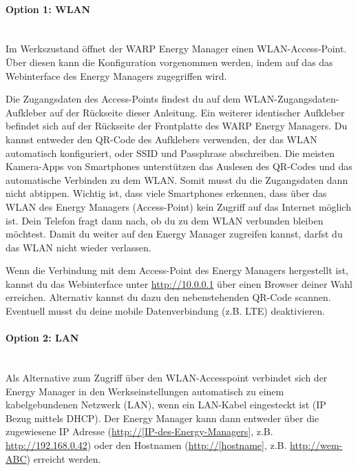 \documentclass[a4paper,10pt]{article}
\begin{document}
\begin{multicols*}{2}
	\paragraph{Option 1: WLAN}\ \\

	Im Werkszustand öffnet der WARP Energy Manager einen WLAN-Access-Point. Über diesen kann
	die Konfiguration vorgenommen werden, indem auf das das Webinterface des
	Energy Managers zugegriffen wird.

	Die Zugangsdaten des Access-Points findest du auf dem WLAN-Zugangsdaten-Aufkleber
	auf der Rückseite dieser Anleitung. Ein weiterer identischer Aufkleber
	befindet sich auf der Rückseite der Frontplatte des WARP Energy Managers.
	Du kannst entweder den QR-Code des Aufklebers verwenden,
	der das WLAN automatisch konfiguriert, oder SSID und Passphrase abschreiben.
	Die meisten Kamera-Apps von Smartphones unterstützen das Auslesen des
	QR-Codes und das automatische Verbinden zu dem WLAN. Somit musst du die
	Zugangsdaten dann nicht abtippen. Wichtig ist, dass viele Smartphones
	erkennen, dass über das WLAN des Energy Managers (Access-Point) kein Zugriff auf das
	Internet möglich ist. Dein Telefon fragt dann nach, ob du zu dem WLAN
	verbunden bleiben möchtest. Damit du weiter auf den Energy Manager zugreifen
	kannst, darfst du das WLAN nicht wieder verlassen.

	\begin{minipage}{0.35\textwidth}
		Wenn die Verbindung mit dem Access-Point des Energy Managers hergestellt ist, kannst du das Webinterface
		unter \url{http://10.0.0.1} über einen Browser deiner Wahl erreichen.
		Alternativ kannst du dazu den nebenstehenden QR-Code scannen.
		Eventuell musst du deine mobile Datenverbindung (z.B. LTE) deaktivieren.
	\end{minipage}\hfill
	\begin{minipage}{0.12\textwidth}
		\begin{flushright}
		\end{flushright}
	\end{minipage}

	\paragraph{Option 2: LAN}\ \\
	Als Alternative zum Zugriff über den WLAN-Accesspoint verbindet sich der
	Energy Manager in den Werkseinstellungen automatisch zu einem
	kabelgebundenen Netzwerk (LAN), wenn ein LAN-Kabel eingesteckt ist (IP Bezug
	mittels DHCP). Der Energy Manager kann dann entweder über die zugewiesene IP
	Adresse (\url{http://[IP-des-Energy-Managers]}, z.B. \url{http://192.168.0.42})
	oder den Hostnamen (\url{http://[hostname]}, z.B. \url{http://wem-ABC}) erreicht werden.


\end{multicols*}
\end{document}
